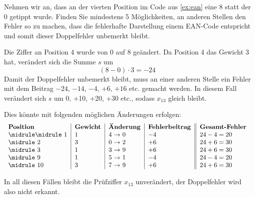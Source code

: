 \begin{myexercise}
Nehmen wir an, dass an der vierten Position im Code aus \cref{ex:ean} eine 8 statt der 0 getippt wurde. Finden Sie mindestens 5 Möglichkeiten, an anderen Stellen den Fehler so zu machen, dass die fehlerhafte Darstellung einem EAN-Code entspricht und somit dieser Doppelfehler unbemerkt bleibt.
\begin{myanswer}
Die Ziffer an Position 4 wurde von 0 auf 8 geändert. Da Position 4 das Gewicht 3 hat, verändert sich die Summe $s$ um
\[
(8-0) \cdot 3 = -24
\]
Damit der Doppelfehler unbemerkt bleibt, muss an einer anderen Stelle ein Fehler mit dem Beitrag $-24$, $-14$, $-4$, $+6$, $+16$ etc. gemacht werden. In diesem Fall verändert sich $s$ um 0, +10, +20, +30 etc., sodass $x_{13}$ gleich bleibt.

Dies könnte mit folgenden möglichen Änderungen erfolgen:
\[
\begin{tabular}{l|l|l|l||l}
\textbf{Position} & \textbf{Gewicht} & \textbf{Änderung} & \textbf{Fehlerbeitrag}  & \textbf{Gesamt-Fehler}\\
\midrule\midrule
1 & 1 & 4 $\rightarrow$ 0 & $-4$ & $24-4=20$ \\\midrule
2 & 3 & 0 $\rightarrow$ 2 & $+6$ & $24+6=30$ \\\midrule
3 & 1 & 3 $\rightarrow$ 9 & $+6$ & $24+6=30$ \\\midrule
9 & 1 & 5 $\rightarrow$ 1 & $-4$ & $24-4=20$ \\\midrule
10 & 3 & 7 $\rightarrow$ 9 & $+6$ & $24+6=30$ \\
\end{tabular}
\]

In all diesen Fällen bleibt die Prüfziffer $x_{13}$ unverändert, der Doppelfehler wird also nicht erkannt.

\end{myanswer}
\end{myexercise}

